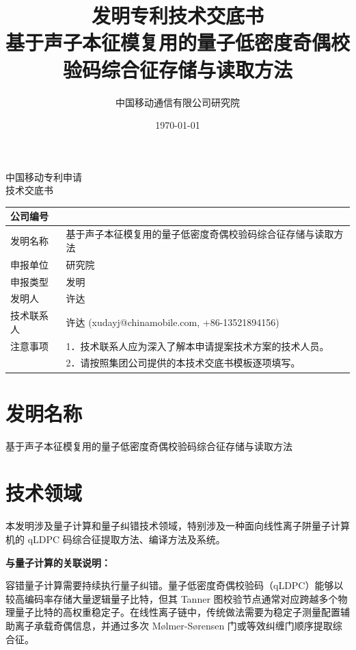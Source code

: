\documentclass[12pt,a4paper]{article}
\title{\textbf{发明专利技术交底书} \\[0.5em]
\Large 基于声子本征模复用的量子低密度奇偶校验码综合征存储与读取方法}
\author{中国移动通信有限公司研究院}
\date{\today}
\begin{document}
\begin{center}
    {\Large\heiti 中国移动专利申请} \\[1em]
    {\Huge\heiti 技术交底书} \\[1em]
\end{center}

\noindent
\begin{tabular}{|p{3cm}|p{12cm}|}
\hline
公司编号 &  \\
\hline
发明名称 & 基于声子本征模复用的量子低密度奇偶校验码综合征存储与读取方法 \\
\hline
申报单位 & 研究院 \\
\hline
申报类型 & 发明 \\
\hline
发明人 & 许达 \\
\hline
技术联系人 & 许达 (xudayj@chinamobile.com, +86-13521894156) \\
\hline
注意事项 & 1．技术联系人应为深入了解本申请提案技术方案的技术人员。 \\
         & 2．请按照集团公司提供的本技术交底书模板逐项填写。 \\
\hline
\end{tabular}

\vspace{1cm}

\section{发明名称}

基于声子本征模复用的量子低密度奇偶校验码综合征存储与读取方法


\section{技术领域}

本发明涉及量子计算和量子纠错技术领域，特别涉及一种面向线性离子阱量子计算机的 qLDPC 码综合征提取方法、编译方法及系统。

\textbf{与量子计算的关联说明：}

容错量子计算需要持续执行量子纠错。量子低密度奇偶校验码（qLDPC）能够以较高编码率存储大量逻辑量子比特，但其 Tanner 图校验节点通常对应跨越多个物理量子比特的高权重稳定子。在线性离子链中，传统做法需要为稳定子测量配置辅助离子承载奇偶信息，并通过多次 Mølmer-Sørensen 门或等效纠缠门顺序提取综合征。
\end{document}
